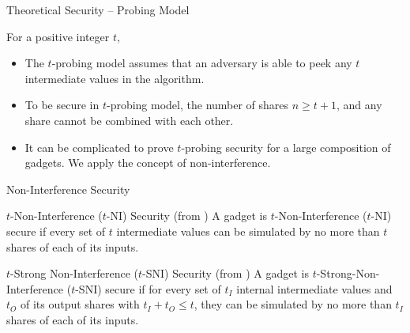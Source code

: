 \begin{frame}{Theoretical Security – Probing Model}

For a positive integer $t$,
\begin{itemize}
	\item The $t$-probing model  \cite{C:IshSahWag03} assumes that an adversary is able to peek any $t$ intermediate values in the algorithm.
	\pause
	\item To be secure in $t$-probing model, the number of shares $n \geq t+1$, and any share cannot be combined with each other.
	\pause
	\item It can be complicated to prove $t$-probing security for a large composition of gadgets. We apply the concept of non-interference.
\end{itemize}

\end{frame}


\begin{frame}{Non-Interference Security}

\begin{definition}{$t$-Non-Interference ($t$-NI) Security (from \cite{CCS:BBDFGS16})}
A gadget is $t$-Non-Interference ($t$-NI) secure if every set of $t$ intermediate values can be simulated by no more than $t$ shares of each of its inputs.
\end{definition}
\medskip
\pause

\begin{definition}{$t$-Strong Non-Interference ($t$-SNI) Security (from \cite{CCS:BBDFGS16})}
A gadget is $t$-Strong-Non-Interference ($t$-SNI) secure if for every set of $t_I$ internal intermediate values and $t_O$ of its output shares with $t_I + t_O \leq t$, they can be simulated by no more than $t_I$ shares of each of its inputs.
\end{definition}
\medskip

\end{frame}


